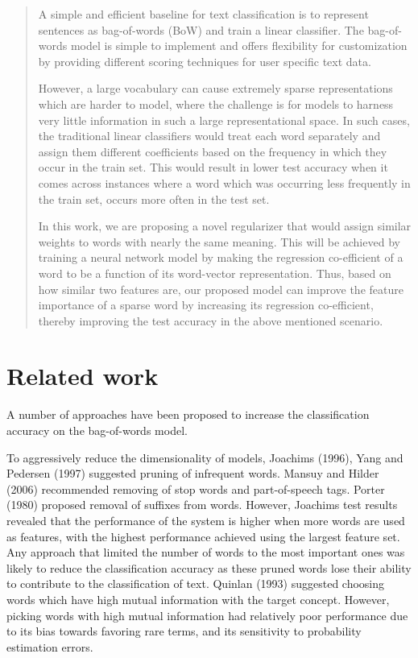 \begin{abstract}
A simple and efficient baseline for text classification is to represent sentences as bag-of-words (BoW) and train a linear classifier. The bag-of-words model is simple to implement and offers flexibility for customization by providing different scoring techniques for user specific text data.

However, a large vocabulary can cause extremely sparse representations which are harder to model, where the challenge is for models to harness very little information in such a large representational space. In such cases, the traditional linear classifiers would treat each word separately and assign them different coefficients based on the frequency in which they occur in the train set. This would result in lower test accuracy when it comes across instances where a word which was occurring less frequently in the train set, occurs more often in the test set.

In this work, we are proposing a novel regularizer that would assign similar weights to words with nearly the same meaning. This will be achieved by training a neural network model by making the regression co-efficient of a word to be a function of its word-vector representation. Thus, based on how similar two features are, our proposed model can improve the feature importance of a sparse word by increasing its regression co-efficient, thereby improving the test accuracy in the above mentioned scenario.

\end{abstract}




\chapter{Related work}

A number of approaches have been proposed to increase the classification accuracy on the bag-of-words model.

To aggressively reduce the dimensionality of models, Joachims \cite{joachims1996probabilistic} (1996), Yang and Pedersen\cite{yang1997comparative} (1997) suggested pruning of infrequent words. Mansuy and Hilder \cite{mansuy2006characterization} (2006) recommended removing of stop words and part-of-speech tags. Porter \cite{porter1980algorithm} (1980) proposed removal of suffixes from words. However, Joachims \cite{joachims1996probabilistic} test results revealed that the performance of the system is higher when more words are used as features, with the highest performance achieved using the largest feature set. Any approach that limited the number of words to the most important ones was likely to reduce the classification accuracy as these pruned words lose their ability to contribute to the classification of text. Quinlan \cite{quinlan2014c4} (1993) suggested choosing words which have high mutual information with the target concept. However, picking words with high mutual information had relatively poor performance due to its bias towards favoring rare terms, and its sensitivity to probability estimation errors.

